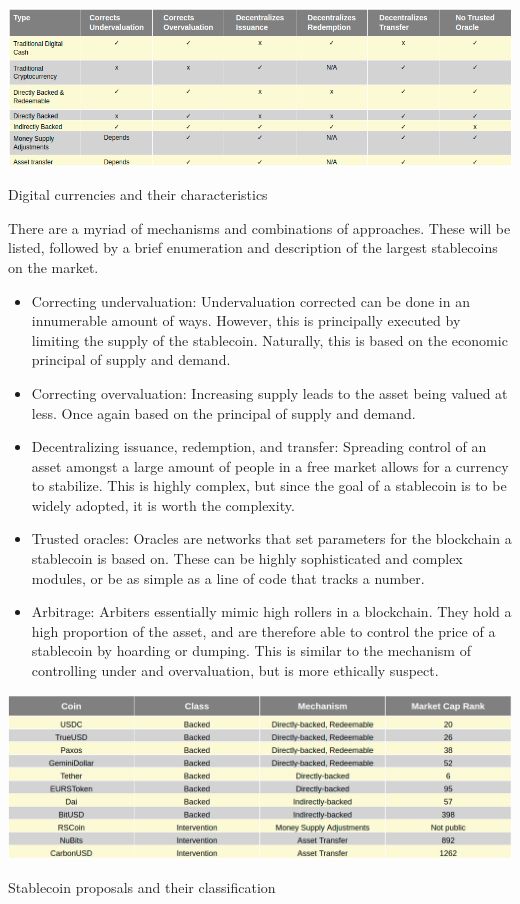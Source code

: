 \documentclass[bsc,frontabs,singlespacing,parskip,deptreport]{infthesis}
\begin{document}
    \begin{table}[h]
    \centering
      \includegraphics[width=\linewidth]{Images and Figures/coinmech.png}
      \caption{Digital currencies and their characteristics}
    \end{table}
    \smallbreak \noindent
    \smallbreak \noindent 
    There are a myriad of mechanisms and combinations of approaches. These will be listed, followed by a brief enumeration and description of the largest stablecoins on the market. 
    \begin{itemize}
        \item Correcting undervaluation: Undervaluation corrected can be done in an innumerable amount of ways. However, this is principally executed by limiting the supply of the stablecoin. Naturally, this is based on the economic principal of supply and demand. 
        \item Correcting overvaluation: Increasing supply leads to the asset being valued at less. Once again based on the principal of supply and demand.
        \item Decentralizing issuance, redemption, and transfer: Spreading control of an asset amongst a large amount of people in a free market allows for a currency to stabilize. This is highly complex, but since the goal of a stablecoin is to be widely adopted, it is worth the complexity. 
        \item Trusted oracles: Oracles are networks that set parameters for the blockchain a stablecoin is based on. These can be highly sophisticated and complex modules, or be as simple as a line of code that tracks a number.
        \item Arbitrage: Arbiters essentially mimic high rollers in a blockchain. They hold a high proportion of the asset, and are therefore able to control the price of a stablecoin by hoarding or dumping. This is similar to the mechanism of controlling under and overvaluation, but is more ethically suspect. 
    \end{itemize}
    \begin{table}[h]
      \includegraphics[width=\linewidth]{Images and Figures/coinproposals.png}
      \caption{Stablecoin proposals and their classification}
    \end{table}
\end{document}
